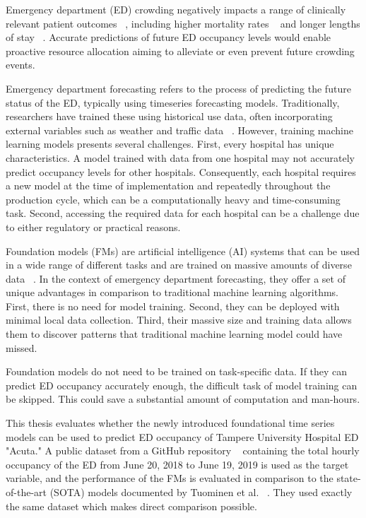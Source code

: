 Emergency department (ED) crowding negatively impacts a range of clinically relevant patient outcomes ~\cite{sartini_overcrowding_2022}, including higher mortality rates ~\cite{berg_associations_2019,jo_emergency_2014} and longer lengths of stay ~\cite{mccarthy_crowding_2009}. Accurate predictions of future ED occupancy levels would enable proactive resource allocation aiming to alleviate or even prevent future crowding events.

Emergency department forecasting refers to the process of predicting the future status of the ED, typically using timeseries forecasting models. Traditionally, researchers have trained these using historical use data, often incorporating external variables such as weather and traffic data ~\cite{tuominen_forecasting_2024,hyndman2018forecasting}. However, training machine learning models presents several challenges. First, every hospital has unique characteristics. A model trained with data from one hospital may not accurately predict occupancy levels for other hospitals. Consequently, each hospital requires a new model at the time of implementation and repeatedly throughout the production cycle, which can be a computationally heavy and time-consuming task. Second, accessing the required data for each hospital can be a challenge due to either regulatory or practical reasons. 

Foundation models (FMs) are artificial intelligence (AI) systems that can be used in a wide range of different tasks and are trained on massive amounts of diverse data ~\cite{bommasani2022opportunitiesrisksfoundationmodels}. In the context of emergency department forecasting, they offer a set of unique advantages in comparison to traditional machine learning algorithms. First, there is no need for model training. Second, they can be deployed with minimal local data collection. Third, their massive size and training data allows them to discover patterns that traditional machine learning model could have missed. ~\cite{bommasani2022opportunitiesrisksfoundationmodels}

Foundation models do not need to be trained on task-specific data. If they can predict ED occupancy accurately enough, the difficult task of model training can be skipped. This could save a substantial amount of computation and man-hours.

This thesis evaluates whether the newly introduced foundational time series models can be used to predict ED occupancy of Tampere University Hospital ED "Acuta." A public dataset from a GitHub repository ~\cite{tuominen2023edmultivar} containing the total hourly occupancy of the ED from June 20, 2018 to June 19, 2019 is used as the target variable, and the performance of the FMs is evaluated in comparison to the state-of-the-art (SOTA) models documented by Tuominen et al. ~\cite{tuominen_forecasting_2024}. They used exactly the same dataset which makes direct comparison possible.

